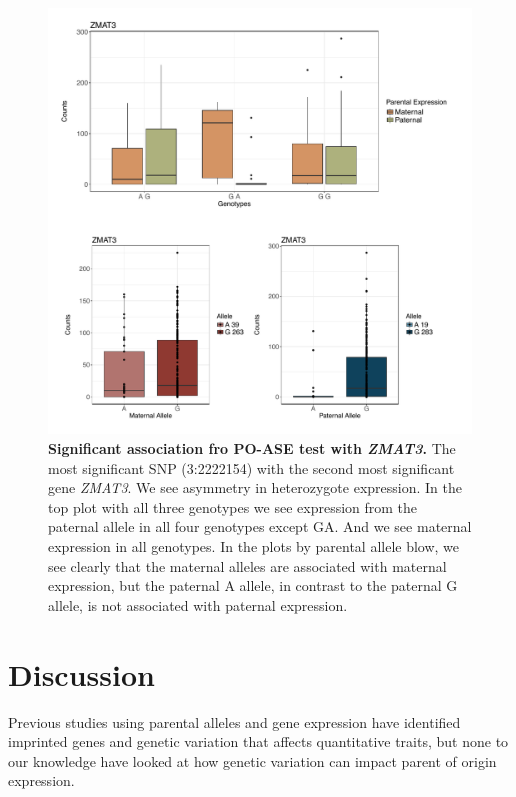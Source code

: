 \begin{figure}[!htb]
\centering \includegraphics[width=5in]{img/ch04/fig-13-ZMAT3.pdf}
\caption[Significant association from PO-ASE test with \emph{ZMAT3}.]{\textbf{Significant association fro PO-ASE test with \emph{ZMAT3}.} The most significant SNP (3:2222154) with the second most significant gene \emph{ZMAT3}. We see asymmetry in heterozygote expression. In the top plot with all three genotypes we see expression from the paternal allele in all four genotypes except GA. And we see maternal expression in all genotypes. In the plots by parental allele blow, we see clearly that the maternal alleles are associated with maternal expression, but the paternal A allele, in contrast to the paternal G allele, is not associated with paternal expression.}
\label{fig:ZMAT3}
\end{figure}
\clearpage


\section{Discussion}\label{ch04-discussion}

Previous studies using parental alleles and gene expression have identified imprinted genes and genetic variation that affects quantitative traits\cite{Zoledziewska:2015do,Baran:2015cx,Benonisdottir:2016dz,Garg2012a}, but none to our knowledge have looked at how genetic variation can impact parent of origin expression.

